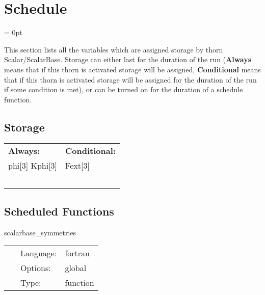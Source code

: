 
\section{Schedule} 


\parskip = 0pt


\noindent This section lists all the variables which are assigned storage by thorn Scalar/ScalarBase.  Storage can either last for the duration of the run ({\bf Always} means that if this thorn is activated storage will be assigned, {\bf Conditional} means that if this thorn is activated storage will be assigned for the duration of the run if some condition is met), or can be turned on for the duration of a schedule function.


\subsection*{Storage}

\hspace{5mm}

 \begin{tabular*}{160mm}{ll} 

{\bf Always:}& {\bf Conditional:} \\ 
 phi[3] Kphi[3] &  Fext[3]\\ 
~ & ~\\ 
\end{tabular*} 


\subsection*{Scheduled Functions}
\vspace{5mm}


\hspace{5mm} scalarbase\_symmetries 

\hspace{5mm}{\it register symmetries of the grid functions } 


\hspace{5mm}

 \begin{tabular*}{160mm}{cll} 
~ & Language:  & fortran \\ 
~ & Options:  & global \\ 
~ & Type:  & function \\ 
\end{tabular*} 


\vspace{5mm}

